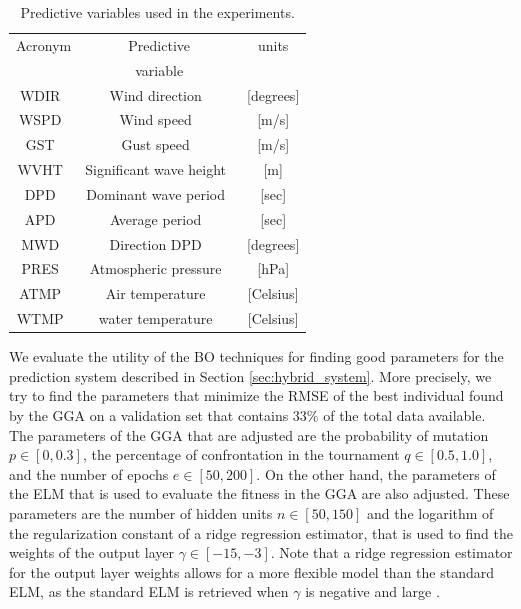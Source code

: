 \begin{table}[htbp]
\begin{center}
\caption{Predictive variables used in the experiments.}
\vspace{0.3cm}
\label{tab:databaseSets}
\begin{tabular}{ccc}
       \hline
Acronym & Predictive            & units \\
&variable&\\
\hline
\hline
WDIR\         & Wind direction\            & [degrees]\\
WSPD\         & Wind speed\                & [m/s]\\
GST\          & Gust speed\                & [m/s]\\
WVHT\         & Significant wave height\   &  [m]\\
DPD\          & Dominant wave period\      & [sec]\\
APD\          & Average period\            & [sec]\\
MWD\          & Direction DPD\             & [degrees]\\
PRES\         & Atmospheric pressure\      & [hPa]\\
ATMP\         & Air temperature\           & [Celsius]\\
WTMP\         & water temperature\         & [Celsius]\\
\hline
\end{tabular}
\end{center}
\end{table}

We evaluate the utility of the BO techniques for finding good parameters for the prediction system described in Section \ref{sec:hybrid_system}. More precisely, we try to find the parameters that minimize the RMSE of the best individual found by the GGA on a
validation set that contains $33\%$ of the total data available. The parameters of the GGA that are adjusted are
the probability of mutation $p\in [0, 0.3]$, the percentage of confrontation in the tournament
$q\in[0.5,1.0]$, and the number of epochs $e\in [50, 200]$. On the other hand, the parameters of the
ELM that is used to evaluate the fitness in the GGA are also adjusted. These parameters are the number of hidden units
$n\in[50,150]$ and the logarithm of the regularization constant of a ridge regression
estimator, that is used to find the weights of the output layer $\gamma \in [-15,-3]$.
Note that a ridge regression estimator for the output layer weights allows for a more flexible
model than the standard ELM, as the standard ELM is retrieved when $\gamma$ is
negative and large \citep{albert1972regression}.

